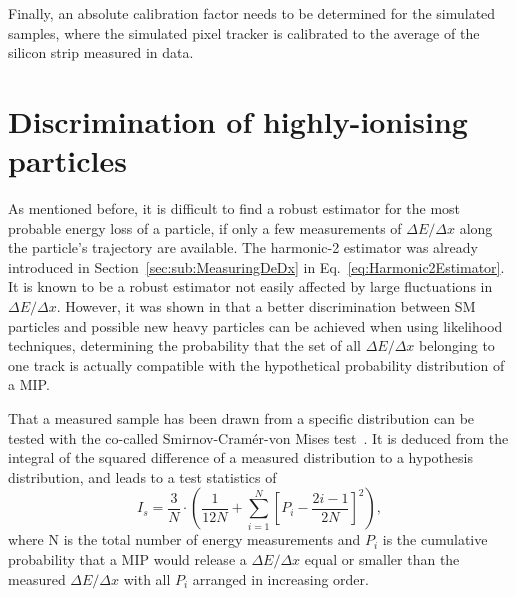Finally, an absolute calibration factor needs to be determined for the simulated samples, where the simulated pixel tracker is calibrated to the average \dedx of the silicon strip measured in data.

\section{Discrimination of highly-ionising particles}
\label{sec:Ias}

As mentioned before, it is difficult to find a robust estimator for the most probable energy loss of a particle, if only a few measurements of $\Delta E/ \Delta x$  along the particle's trajectory are available.
The harmonic-2 estimator \ihtwo was already introduced in Section~\ref{sec:sub:MeasuringDeDx} in Eq.~\eqref{eq:Harmonic2Estimator}.
It is known to be a robust estimator not easily affected by large fluctuations in $\Delta E/ \Delta x$.
However, it was shown in \cite{bib:Quertenmont_2010} that a better discrimination between SM particles and possible new heavy particles can be achieved when using likelihood techniques,
\ie determining the probability that the set of all $\Delta E/ \Delta x$ belonging to one track is actually compatible with the hypothetical probability distribution of a MIP.

That a measured sample has been drawn from a specific distribution can be tested with the co-called Smirnov-Cram\'{e}r-von Mises test~\cite{bib:Anderson:CramerVonMises_1962,bib:James:StaticticalMethods_2006}.
It is deduced from the integral of the squared difference of a measured distribution to a hypothesis distribution, 
and leads to a test statistics of~\cite{bib:Quertenmont_2010}
\begin{equation}
I_s = \frac{3}{N} \cdot \left( \frac{1}{12N} + \sum\limits_{i=1}^N \left[ P_i - \frac{2i-1}{2N} \right]^2 \right),
\end{equation}
where N is the total number of energy measurements and $P_i$ is the cumulative probability that a MIP would release a $\Delta E/\Delta x$ equal or smaller than the measured $\Delta E/ \Delta x$ with all $P_i$ arranged in increasing order.

